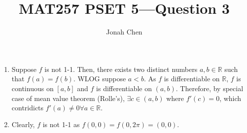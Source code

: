 \documentclass{exam}
\title{MAT257 PSET 5---Question 3}
\author{Jonah Chen}
\numberwithin{equation}{section}
\newcommand{\R}{\mathbb{R}}
\begin{document}
    \sffamily
    \maketitle
    \begin{enumerate}[label=(\alph*)]
        \item Suppose $f$ is not 1-1. Then, there exists two distinct numbers $a,b\in\R$ such that $f(a)=f(b)$. WLOG suppose $a<b$. As $f$ is differentiable on $\R$, $f$ is continuous on $[a,b]$ and $f$ is differentiable on $(a,b)$. Therefore, by special case of mean value theorem (Rolle's), $\exists c\in (a,b)$ where $f'(c)=0$, which contridicts $f'(a)\neq0\forall a\in\R$.
        
        \item Clearly, $f$ is not 1-1 as $f(0,0)=f(0,2\pi)=(0, 0)$.
        

\end{enumerate}
\end{document}
